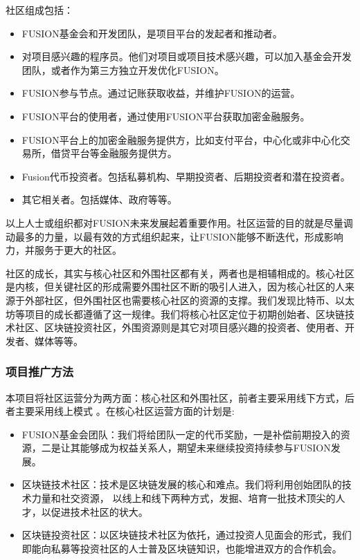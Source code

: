 \documentclass[a4paper,12pt]{article}
\begin{document}
社区组成包括：
\begin{itemize}[itemindent=1em]
\item FUSION基金会和开发团队，是项目平台的发起者和推动者。
\item 对项目感兴趣的程序员。他们对项目或项目技术感兴趣，可以加入基金会开发团队，或者作为第三方独立开发优化FUSION。
\item FUSION参与节点。通过记账获取收益，并维护FUSION的运营。
\item FUSION平台的使用者，通过使用FUSION平台获取加密金融服务。
\item FUSION平台上的加密金融服务提供方，比如支付平台，中心化或非中心化交易所，借贷平台等金融服务提供方。
\item Fusion代币投资者。包括私募机构、早期投资者、后期投资者和潜在投资者。
\item 其它相关者。包括媒体、政府等等。
\end{itemize}

以上人士或组织都对FUSION未来发展起着重要作用。社区运营的目的就是尽量调动最多的力量，以最有效的方式组织起来，让FUSION能够不断迭代，形成影响力，并服务于更大的社区。

社区的成长，其实与核心社区和外围社区都有关，两者也是相辅相成的。核心社区是内核，但关键社区的形成需要外围社区不断的吸引人进入，因为核心社区的人来源于外部社区，但外围社区也需要核心社区的资源的支撑。我们发现比特币、以太坊等项目的成长都遵循了这一规律。我们将核心社区定位于初期创始者、区块链技术社区、区块链投资社区，外围资源则是其它对项目感兴趣的投资者、使用者、开发者、媒体等等。

\subsubsection{项目推广方法}

本项目将社区运营分为两方面：核心社区和外围社区，前者主要采用线下方式，后者主要采用线上模式 。在核心社区运营方面的计划是:

\begin{itemize}[itemindent=1em]
\item FUSION基金会团队：我们将给团队一定的代币奖励，一是补偿前期投入的资源，二是让其能够成为权益关系人，期望未来继续投资持续参与FUSION发展。
\item 区块链技术社区：技术是区块链发展的核心和难点。我们将利用创始团队的技术力量和社交资源， 以线上和线下两种方式，发掘、培育一批技术顶尖的人才，以促进技术社区的状大。
\item 区块链投资社区：以区块链技术社区为依托，通过投资人见面会的形式，我们即能向私募等投资社区的人士普及区块链知识，也能增进双方的合作机会。
\end{itemize}
\end{document}
